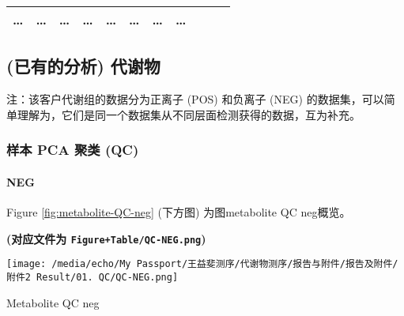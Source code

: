 \documentclass[
]{article}
\begin{document}
\begin{longtable}[]{@{}lllllllllll@{}}
\begin{minipage}[t]{0.06\columnwidth}
\ldots{}\strut
\end{minipage} & \begin{minipage}[t]{0.09\columnwidth}\raggedright
\ldots{}\strut
\end{minipage} & \begin{minipage}[t]{0.06\columnwidth}\raggedright
\ldots{}\strut
\end{minipage} & \begin{minipage}[t]{0.09\columnwidth}\raggedright
\ldots{}\strut
\end{minipage} & \begin{minipage}[t]{0.06\columnwidth}\raggedright
\ldots{}\strut
\end{minipage} & \begin{minipage}[t]{0.06\columnwidth}\raggedright
\ldots{}\strut
\end{minipage} & \begin{minipage}[t]{0.06\columnwidth}\raggedright
\ldots{}\strut
\end{minipage} & \begin{minipage}[t]{0.03\columnwidth}\raggedright
\ldots{}\strut
\end{minipage}\tabularnewline
\bottomrule
\end{longtable}

\hypertarget{metabo}{%
\subsection{(已有的分析) 代谢物}\label{metabo}}

注：该客户代谢组的数据分为正离子 (POS) 和负离子 (NEG) 的数据集，可以简单理解为，它们是同一个数据集从不同层面检测获得的数据，互为补充。

\hypertarget{ux6837ux672c-pca-ux805aux7c7b-qc}{%
\subsubsection{样本 PCA 聚类 (QC)}\label{ux6837ux672c-pca-ux805aux7c7b-qc}}

\hypertarget{neg}{%
\paragraph{NEG}\label{neg}}

Figure \ref{fig:metabolite-QC-neg} (下方图) 为图metabolite QC neg概览。

\textbf{(对应文件为 \texttt{Figure+Table/QC-NEG.png})}

\def\@captype{figure}
\begin{center}
\texttt{[image: /media/echo/My Passport/王益斐测序/代谢物测序/报告与附件/报告及附件/附件2 Result/01. QC/QC-NEG.png]}
\caption{Metabolite QC neg}\label{fig:metabolite-QC-neg}
\end{center}
\end{document}
